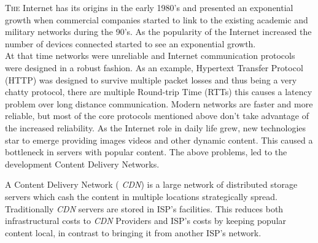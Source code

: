 \documentclass{llncs}
\begin{document}
\lettrine[lines=2]{T}{he} Internet has its origins in the early 1980's and presented an exponential growth when commercial companies started to link to the existing academic and military networks during the 90's. As the popularity of the Internet increased the number of devices connected started to see an exponential growth.\\ 
At that time networks were unreliable and Internet communication protocols were designed in a robust fashion. As an example, Hypertext Transfer Protocol (HTTP) was designed to survive multiple packet losses and thus being a very chatty protocol, there are multiple Round-trip Time (RTTs) this causes a latency problem over long distance communication.
Modern networks are faster and more reliable, but most of the core protocols mentioned above don't take advantage of the increased reliability. %
As the Internet role in daily life grew, new technologies star to emerge providing images videos and other dynamic content. This caused a bottleneck in servers with popular content.
The above problems, led to the development Content Delivery Networks.

A Content Delivery Network ( \textit{CDN}) is a large network of distributed storage servers which cash the content in multiple locations strategically spread. Traditionally \textit{CDN} servers are stored in ISP's facilities. This reduces both infrastructural costs to \textit{CDN} Providers and ISP's costs by keeping popular content local, in contrast to bringing it from another ISP's network.
\end{document}
